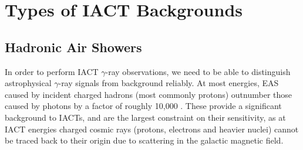 \section{Types of IACT Backgrounds}
\subsection{Hadronic Air Showers}

In order to perform IACT $\gamma$-ray observations, we need to be able to distinguish astrophysical $\gamma$-ray signals from background reliably. At most energies, EAS caused by incident charged hadrons (most commonly protons) outnumber those caused by photons by a factor of roughly 10,000 \cite{Benbow}. These provide a significant background to IACTs, and are the largest constraint on their sensitivity, as at IACT energies charged cosmic rays (protons, electrons and heavier nuclei) cannot be traced back to their origin due to scattering in the galactic magnetic field.


